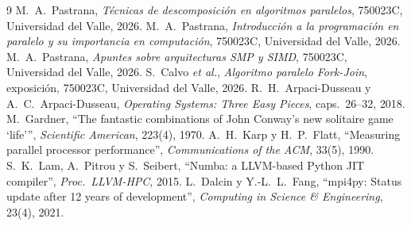 \documentclass[11pt,a4paper]{article}
\begin{document}
\begin{thebibliography}{9}\small
{} M.~A.~Pastrana, \emph{Técnicas de descomposición en algoritmos paralelos}, 750023C, Universidad del Valle, 2026.
 M.~A.~Pastrana, \emph{Introducción a la programación en paralelo y su importancia en computación}, 750023C, Universidad del Valle, 2026.
 M.~A.~Pastrana, \emph{Apuntes sobre arquitecturas SMP y SIMD}, 750023C, Universidad del Valle, 2026.
 S.~Calvo \emph{et al.}, \emph{Algoritmo paralelo Fork-Join}, exposición, 750023C, Universidad del Valle, 2026.
 R.~H.~Arpaci-Dusseau y A.~C.~Arpaci-Dusseau, \emph{Operating Systems: Three Easy Pieces}, caps.~26--32, 2018.
 M.~Gardner, ``The fantastic combinations of John Conway's new solitaire game `life''', \emph{Scientific American}, 223(4), 1970.
 A.~H.~Karp y H.~P.~Flatt, ``Measuring parallel processor performance'', \emph{Communications of the ACM}, 33(5), 1990.
 S.~K.~Lam, A.~Pitrou y S.~Seibert, ``Numba: a LLVM-based Python JIT compiler'', \emph{Proc.\ LLVM-HPC}, 2015.
 L.~Dalcin y Y.-L.~L.~Fang, ``mpi4py: Status update after 12 years of development'', \emph{Computing in Science \& Engineering}, 23(4), 2021.
\end{thebibliography}
\end{document}
